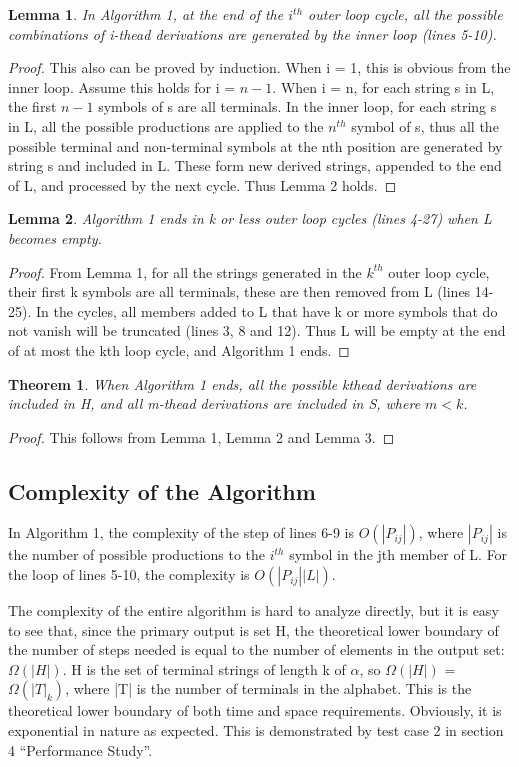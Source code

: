 \documentclass{sig-alternate-05-2015}
\newtheorem{theorem}{Theorem}
\newtheorem{lemma}{Lemma}
\begin{document}
\begin{lemma}
In Algorithm 1, at the end of the $i^{th}$ outer
loop cycle, all the possible combinations of i-thead derivations
are generated by the inner loop (lines 5-10).
\end{lemma}
\begin{proof}
This also can be proved by induction. When i = 1,
this is obvious from the inner loop. Assume this holds for i
= $n-1$. When i = n, for each string s in L, the first $n-1$ symbols
of s are all terminals. In the inner loop, for each string
s in L, all the possible productions are applied to the $n^{th}$
symbol of s, thus all the possible terminal and non-terminal
symbols at the nth position are generated by string s and
included in L. These form new derived strings, appended to
the end of L, and processed by the next cycle. Thus Lemma
2 holds.
\end{proof}

\begin{lemma}
Algorithm 1 ends in k or less outer loop cycles
(lines 4-27) when L becomes empty.
\end{lemma}
\begin{proof}
From Lemma 1, for all the strings generated in
the $k^{th}$ outer loop cycle, their first k symbols are all terminals,
these are then removed from L (lines 14-25). In the
cycles, all members added to L that have k or more symbols
that do not vanish will be truncated (lines 3, 8 and 12).
Thus L will be empty at the end of at most the kth loop
cycle, and Algorithm 1 ends.
\end{proof}

\begin{theorem}
When Algorithm 1 ends, all the possible kthead
derivations are included in H, and all m-thead derivations
are included in S, where $m < k$.
\end{theorem}
\begin{proof}
This follows from Lemma 1, Lemma 2 and
Lemma 3.
\end{proof}


\subsection{Complexity of the Algorithm}
In Algorithm 1, the complexity of the step of lines 6-9 is
$O(|P_{ij}|)$, where $|P_{ij}|$ is the number of possible productions to
the $i^{th}$ symbol in the jth member of L. For the loop of lines
5-10, the complexity is $O(|P_{ij}||L|)$.

The complexity of the entire algorithm is hard to analyze
directly, but it is easy to see that, since the primary output
is set H, the theoretical lower boundary of the number of
steps needed is equal to the number of elements in the output
set: $\Omega(|H|)$. H is the set of terminal strings of length k of
$\alpha$, so $\Omega(|H|)$ = $\Omega(|T|_k)$, where |T| is the number of terminals
in the alphabet. This is the theoretical lower boundary of
both time and space requirements. Obviously, it is exponential
in nature as expected. This is demonstrated by test
case 2 in section 4 “Performance Study”.
\end{document}
